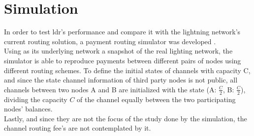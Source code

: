 \section{Simulation}

In order to test \acrshort{ldr}'s performance and compare it with the lightning network's current routing solution, a payment routing simulator was developed \cite{simulator}. \\
Using as its underlying network a snapshot of the real lighting network, the simulator is able to reproduce payments between different pairs of nodes using different routing schemes. To define the initial states of channels with capacity C, and since the state channel information of third party nodes is not public, all channels between two nodes A and B are initialized with the state (A: $\frac{C}{2}$, B: $\frac{C}{2}$), dividing the capacity $C$ of the channel equally between the two participating nodes' balances.\\
Lastly, and since they are not the focus of the study done by the simulation, the channel routing fee's are not contemplated by it.\\

